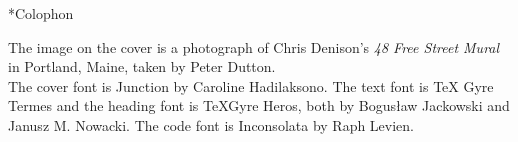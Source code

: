 \begin{chapter}*{Colophon}

The image on the cover is a photograph of Chris Denison's \emph{48
Free Street Mural} in Portland, Maine, taken by Peter Dutton.\\

\noindent
The cover font is Junction by Caroline Hadilaksono.  The text font is \TeX
Gyre Termes and the heading font is \TeX Gyre Heros, both by Bogus\l{}aw
Jackowski and Janusz M. Nowacki.  The code font is Inconsolata by Raph Levien.

\end{chapter}

\pagebreak
\thispagestyle{empty}
\mbox{}

